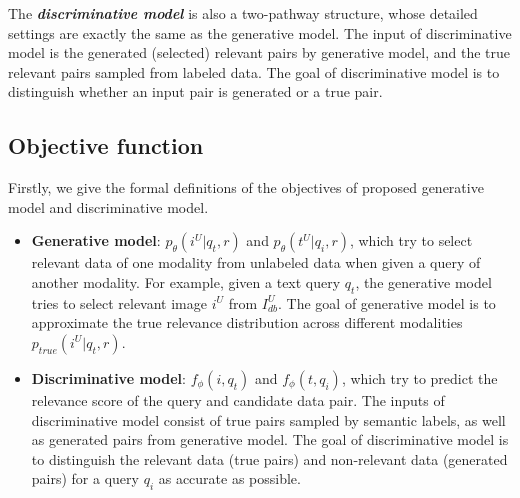 \documentclass[journal]{IEEEtran}
\begin{document}
The \textit{\textbf{discriminative model}} is also a two-pathway structure, whose detailed settings are exactly the same as the generative model. The input of discriminative model is the generated (selected) relevant pairs by generative model, and the true relevant pairs sampled from labeled data. The goal of discriminative model is to distinguish whether an input pair is generated or a true pair. 

\subsection{Objective function}
Firstly, we give the formal definitions of the objectives of proposed generative model and discriminative model.
\begin{itemize}
	\item \textbf{Generative model}: $p_\theta(i^U|q_t,r)$ and $p_\theta(t^U|q_i,r)$, which try to select relevant data of one modality from unlabeled data when given a query of another modality. For example, given a text query $q_t$, the generative model tries to select relevant image $i^U$ from $I_{db}^U$. The goal of generative model is to approximate the true relevance distribution across different modalities $p_{true}(i^U|q_t,r)$.
	\item \textbf{Discriminative model}: $f_\phi(i,q_t)$ and $f_\phi(t,q_i)$, which try to predict the relevance score of the query and candidate data pair. The inputs of discriminative model consist of true pairs sampled by semantic labels, as well as generated pairs from generative model. The goal of discriminative model is to distinguish the relevant data (true pairs) and non-relevant data (generated pairs) for a query $q_i$ as accurate as possible.
\end{itemize}
\end{document}
